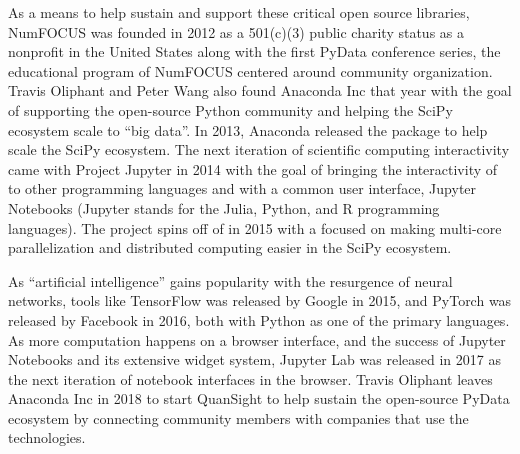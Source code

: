 \documentclass[010-intro.tex]{subfiles}
\begin{document}
        As a means to help sustain and support these critical open source libraries,
        NumFOCUS was founded in 2012 as a 501(c)(3) public charity status as a nonprofit in the United States along with the first PyData
        conference series, the educational program of NumFOCUS centered around community organization.
        Travis Oliphant and Peter Wang also found Anaconda Inc that year
        with the goal of supporting the open-source Python community and helping the SciPy ecosystem scale to ``big data''. %
        In 2013, Anaconda released the  package to help scale the SciPy ecosystem.
        The next iteration of scientific computing interactivity came with Project Jupyter in 2014
        with the goal of bringing the interactivity of  to other programming languages and with a common user interface,
        Jupyter Notebooks (Jupyter stands for the Julia, Python, and R programming languages).
        The  project spins off of  in 2015 with a focused on
        making multi-core parallelization and distributed computing easier in the SciPy ecosystem.

        As ``artificial intelligence'' gains popularity with the resurgence of neural networks,
        tools like TensorFlow was released by Google in 2015,
        and PyTorch was released by Facebook in 2016,
        both with Python as one of the primary languages.
        As more computation happens on a browser interface, and the success of Jupyter Notebooks and its extensive widget system,
        Jupyter Lab was released in 2017 as the next iteration of notebook interfaces in the browser.
        Travis Oliphant leaves Anaconda Inc in 2018 to start QuanSight to help sustain the open-source PyData ecosystem
        by connecting community members with companies that use the technologies.
\end{document}
